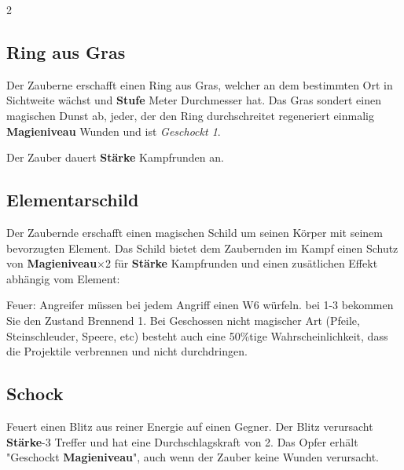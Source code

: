 \begin{multicols*}{2}


\subsection{Ring aus Gras}

Der Zauberne erschafft einen Ring aus Gras, welcher an dem bestimmten Ort in Sichtweite wächst und \textbf{Stufe} Meter Durchmesser hat. Das Gras sondert einen magischen Dunst ab, jeder, der den Ring durchschreitet regeneriert einmalig \textbf{Magieniveau} Wunden und ist \textit{Geschockt 1}.

Der Zauber dauert \textbf{Stärke} Kampfrunden an.



\subsection{Elementarschild}

Der Zaubernde erschafft einen magischen Schild um seinen Körper mit seinem bevorzugten Element. Das Schild bietet dem Zaubernden im Kampf einen Schutz von \textbf{Magieniveau}×2 für \textbf{Stärke} Kampfrunden und einen zusätlichen Effekt abhängig vom Element:

Feuer: Angreifer müssen bei jedem Angriff einen W6 würfeln. bei 1-3 bekommen Sie den Zustand Brennend 1. Bei Geschossen nicht magischer Art (Pfeile, Steinschleuder, Speere, etc) besteht auch eine 50\%tige Wahrscheinlichkeit, dass die Projektile verbrennen und nicht durchdringen.



\subsection{Schock}

Feuert einen Blitz aus reiner Energie auf einen Gegner. Der Blitz verursacht \textbf{Stärke}-3 Treffer und hat eine Durchschlagskraft von 2. Das Opfer erhält "Geschockt \textbf{Magieniveau}", auch wenn der Zauber keine Wunden verursacht.




\end{multicols*}
